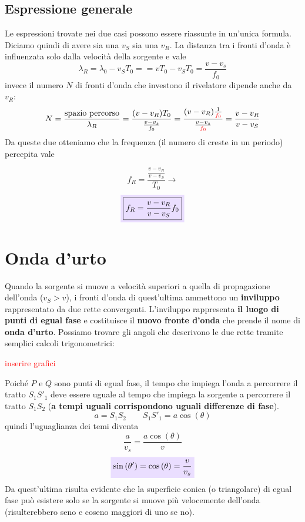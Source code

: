 \documentclass[x11names]{report}
\newcommand{\viola}[1]{\colorbox{yred}{$\displaystyle #1$}}
\begin{document}
	\subsection{Espressione generale}
	Le espressioni trovate nei due casi possono essere riassunte in un'unica formula. Diciamo quindi di avere sia una \(v_S\) sia una \(v_R\). La distanza tra i fronti d'onda è influenzata solo dalla velocità della sorgente e vale
	\[ 
	\lambda_R = \lambda_0 - v_ST_0 = = vT_0 - v_ST_0 = \frac{v - v_s}{f_0}
	\]
	invece il numero \(N\) di fronti d'onda che investono il rivelatore dipende anche da \(v_R\):
	\[ 
	N = \frac{\text{spazio percorso}}{\lambda_R} = \frac{(v - v_R)T_0}{\frac{v - v_s}{f_0}} = \frac{(v - v_R)\frac{1}{\textcolor{red}{f_0}}}{\frac{v - v_s}{\textcolor{red}{f_0}}} = \frac{v - v_R}{v - v_S}
	\]
	Da queste due otteniamo che la frequenza (il numero di creste in un periodo) percepita vale
	
	\[ 
	f_R = \frac{\frac{v - v_R}{v-v_S}}{T_0} \to
	\]
	\begin{equation}
		\viola{\boxed{f_R = \frac{v - v_R}{v-v_S}f_0}}
	\end{equation}
	
	\section{Onda d'urto}
	Quando la sorgente si muove a velocità superiori a quella di propagazione dell'onda (\(v_S > v\)), i fronti d'onda di quest'ultima ammettono un \textbf{inviluppo} rappresentato da due rette convergenti. L'inviluppo rappresenta \textbf{il luogo di punti di egual fase} e costituisce il  \textbf{nuovo fronte d'onda} che prende il nome di \textbf{onda d'urto}. Possiamo trovare gli angoli che descrivono le due rette tramite semplici calcoli trigonometrici: 
	\begin{center}
		\textcolor{red}{inserire grafici}
	\end{center}
	Poiché \(P\) e \(Q\) sono punti di egual fase, il tempo che impiega l'onda a percorrere il tratto \(S_1S'_1\) deve essere uguale al tempo che impiega la sorgente a percorrere il tratto \(S_1S_2\) (\textbf{a tempi uguali corrispondono uguali differenze di fase}).
	\[ 
	\boxed{a = S_1S_2} \qquad \boxed{S_1S'_1 = a\cos\left(\theta\right)}
	\]
	quindi l'uguaglianza dei temi diventa
	\[ 
	\frac{a}{v_s} = \frac{a\cos\left(\theta\right)}{v}
	\]
	\begin{equation}
		\viola{\sin\left(\theta'\right) = \cos\left(\theta\right) = \frac{v}{v_s} }
	\end{equation}
	Da quest'ultima risulta evidente che la superficie conica (o triangolare) di egual fase può esistere solo se la sorgente si muove più velocemente dell'onda (risulterebbero seno e coseno maggiori di uno se no).
	
\end{document}
